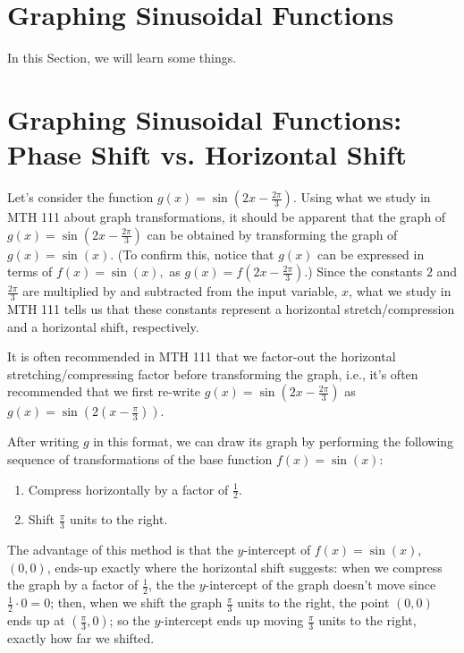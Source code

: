 
\section{Graphing Sinusoidal Functions} \label{supplement-graphing-sinusoidal-functions}
In this Section, we will learn some things.

  \section*{Graphing Sinusoidal Functions: Phase Shift vs. Horizontal Shift}
    
      Let's consider the function $g(x)=\sin \left( 2x-\frac{2\pi}{3} \right)$.  Using what we study in MTH 111 about graph transformations, it should be apparent that the graph of $g(x)=\sin \left( 2x-\frac{2\pi}{3} \right)$ can be obtained by transforming the graph of $g(x)=\sin(x)$. (To confirm this, notice that $g(x)$ can be expressed in terms of $f(x)=\sin(x),$ as $g(x)=f \left( 2x-\frac{2\pi}{3} \right)$.)  Since the constants $2$ and $\frac{2\pi}{3}$ are multiplied by and subtracted from the input variable, $x$, what we study in MTH 111 tells us that these constants represent a horizontal stretch/compression and a horizontal shift, respectively.
    
      It is often recommended in MTH 111 that we factor-out the horizontal stretching/compressing factor before transforming the graph, i.e., it's often recommended that we first re-write $g(x)=\sin \left( 2x-\frac{2\pi}{3} \right)$  as $g(x)=\sin \left( 2 \left( x-\frac{\pi}{3} \right)\right)$.
    
      After writing $g$ in this format, we can draw its graph by performing the following sequence of transformations of the base function $f(x)=\sin(x)$:
      
      \begin{enumerate}
        \item Compress horizontally by a factor of $\frac{1}{2}$.
        \item Shift $\frac{\pi}{3}$ units to the right.
      \end{enumerate}
    
      The advantage of this method is that the $y$-intercept of $f(x)=\sin(x)$, $ \left( 0,0 \right)$, ends-up exactly where the horizontal shift suggests: when we compress the graph by a factor of $\frac{1}{2}$, the the $y$-intercept of the graph doesn't move since $\frac{1}{2} \cdot 0 = 0$; then, when we shift the graph $\frac{\pi}{3}$ units to the right, the point  $\left( 0,0\right)$  ends up at $\left( \frac{\pi}{3},0\right)$; so the $y$-intercept ends up moving $\frac{\pi}{3}$ units to the right, exactly how far we shifted.
    
